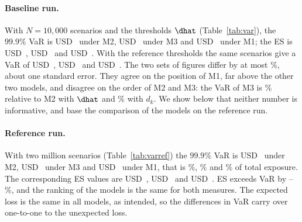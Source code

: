 \paragraph{Baseline run.}
With $N=10{,}000$ scenarios and the thresholds $\dhat$ (Table~\ref{tab:var}), the $99.9\%$ VaR is USD~ under M2, USD~ under M3 and USD~ under M1; the ES is USD~, USD~ and USD~. With the reference thresholds the same scenarios give a VaR of USD~, USD~ and USD~. The two sets of figures differ by at most \%, about one standard error. They agree on the position of M1, far above the other two models, and disagree on the order of M2 and M3: the VaR of M3 is \% relative to M2 with $\dhat$ and \% with $d_k$. We show below that neither number is informative, and base the comparison of the models on the reference run.

\paragraph{Reference run.}
With two million scenarios (Table~\ref{tab:varref}) the $99.9\%$ VaR is USD~ under M2, USD~ under M3 and USD~ under M1, that is \%, \% and \% of total exposure. The corresponding ES values are USD~, USD~ and USD~. ES exceeds VaR by --\%, and the ranking of the models is the same for both measures. The expected loss is the same in all models, as intended, so the differences in VaR carry over one-to-one to the unexpected loss.

